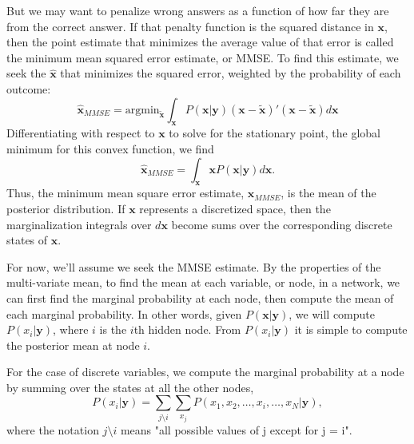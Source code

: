 But we may want to penalize wrong answers as a function of how far
they are from the correct answer.  If that penalty function is
the squared distance in $\mathbf{x}$, then the point estimate that
minimizes the average value of that error is called the minimum mean squared error
estimate, or MMSE.  To find this estimate, we seek 
the $\hat{\mathbf{x}}$ that minimizes the squared error, weighted by the probability of each outcome:
\begin{equation}
\hat{\mathbf{x}}_{MMSE} = \mbox{argmin}_{\tilde{\mathbf{x}}} 
\int_{\mathbf{x}} P(\mathbf{x}|\mathbf{y}) (\mathbf{x}-\tilde{\mathbf{x}})'
(\mathbf{x}-\tilde{\mathbf{x}}) d\mathbf{x}
\end{equation} 
Differentiating with respect to $\mathbf{x}$ to solve for the stationary
point, the global minimum for this convex function, we find
\begin{equation}
\hat{\mathbf{x}}_{MMSE} = \int_{\mathbf{x}} \mathbf{x} P(\mathbf{x}|\mathbf{y})  d\mathbf{x}.
\end{equation}
Thus, the minimum mean square error estimate, $\hat{\mathbf{x}}_{MMSE}$,
is the mean of the posterior distribution.  
If $\mathbf{x}$ represents a discretized space, then the
marginalization integrals over $d\mathbf{x}$ become sums over the
corresponding discrete states of $\mathbf{x}$.

For now, we'll assume we seek the MMSE estimate. By the properties of
the multi-variate mean, to find the mean at each variable, or node, in
a network, we can first find the marginal probability at each node,
then compute the mean of each marginal probability.  In other words,
given $P(\mathbf{x} | \mathbf{y})$, we will compute $P(x_i | \mathbf{y})$,
where $i$ is the $i$th hidden node.  From $P(x_i | \mathbf{y})$ it is
simple to compute the posterior mean at node $i$.

For the case of discrete variables, we compute the marginal probability at a node by summing over the states at all the other nodes,
\begin{equation}
    P(x_i | \mathbf{y}) =  \sum_{j  \mbox{\textbackslash} i} \sum_{x_j} 
    P(x_1, x_2, \ldots, x_i, \ldots, x_N|\mathbf{y}),
    \label{eq:discreteMarginalization}
\end{equation}
where the notation $j \mbox{\textbackslash} i$ means "all possible values of j except for j = i".

